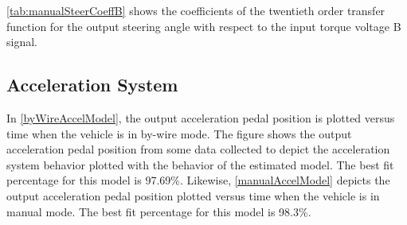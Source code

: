 \documentclass[letterpaper,12pt]{article}   %
\begin{document}
\noindent \autoref{tab:manualSteerCoeffB} shows the coefficients of
the twentieth order transfer function for the output steering angle with respect
to the input torque voltage B signal. %
%
\begin{table}[hbtp]
	\caption{Manual Mode Steering Transfer Function Torque Voltage B Coefficient Table}
	\label{tab:manualSteerCoeffB}
  \centering
	\begin{center}
	\end{center}	
\end{table}
%

\subsection{Acceleration System}
In \autoref{byWireAccelModel}, the output acceleration pedal position is plotted versus time when the vehicle is in by-wire mode. The figure shows the output acceleration pedal position from some data collected to depict the acceleration system behavior plotted with the behavior of the estimated model. The best fit percentage for this model is 97.69\%. Likewise, \autoref{manualAccelModel} depicts the output acceleration pedal position plotted versus time when the vehicle is in manual mode. The best fit percentage for this model is 98.3\%. 
\end{document}
